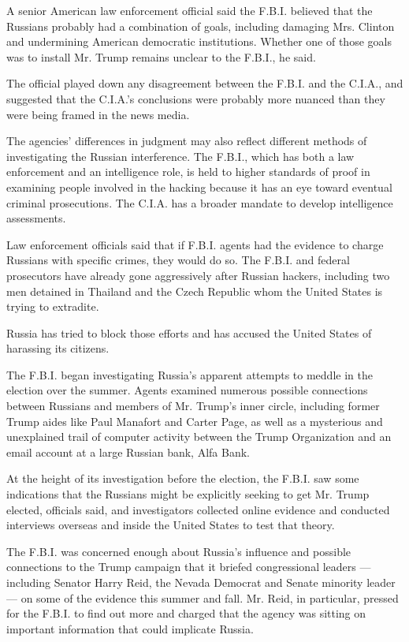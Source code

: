 A senior American law enforcement official said the F.B.I. believed that
the Russians probably had a combination of goals, including damaging
Mrs. Clinton and undermining American democratic institutions. Whether
one of those goals was to install Mr. Trump remains unclear to the
F.B.I., he said.

The official played down any disagreement between the F.B.I. and the
C.I.A., and suggested that the C.I.A.'s conclusions were probably more
nuanced than they were being framed in the news media.

The agencies' differences in judgment may also reflect different methods
of investigating the Russian interference. The F.B.I., which has both a
law enforcement and an intelligence role, is held to higher standards of
proof in examining people involved in the hacking because it has an eye
toward eventual criminal prosecutions. The C.I.A. has a broader mandate
to develop intelligence assessments.

Law enforcement officials said that if F.B.I. agents had the evidence to
charge Russians with specific crimes, they would do so. The F.B.I. and
federal prosecutors have already gone aggressively after Russian
hackers, including two men detained in Thailand and the Czech Republic
whom the United States is trying to extradite.

Russia has tried to block those efforts and has accused the United
States of harassing its citizens.

The F.B.I. began investigating Russia's apparent attempts to meddle in
the election over the summer. Agents examined numerous possible
connections between Russians and members of Mr. Trump's inner circle,
including former Trump aides like Paul Manafort and Carter Page, as well
as a mysterious and unexplained trail of computer activity between the
Trump Organization and an email account at a large Russian bank, Alfa
Bank.

At the height of its investigation before the election, the F.B.I. saw
some indications that the Russians might be explicitly seeking to get
Mr. Trump elected, officials said, and investigators collected online
evidence and conducted interviews overseas and inside the United States
to test that theory.

The F.B.I. was concerned enough about Russia's influence and possible
connections to the Trump campaign that it briefed congressional leaders
--- including Senator Harry Reid, the Nevada Democrat and Senate
minority leader --- on some of the evidence this summer and fall. Mr.
Reid, in particular, pressed for the F.B.I. to find out more and charged
that the agency was sitting on important information that could
implicate Russia.

